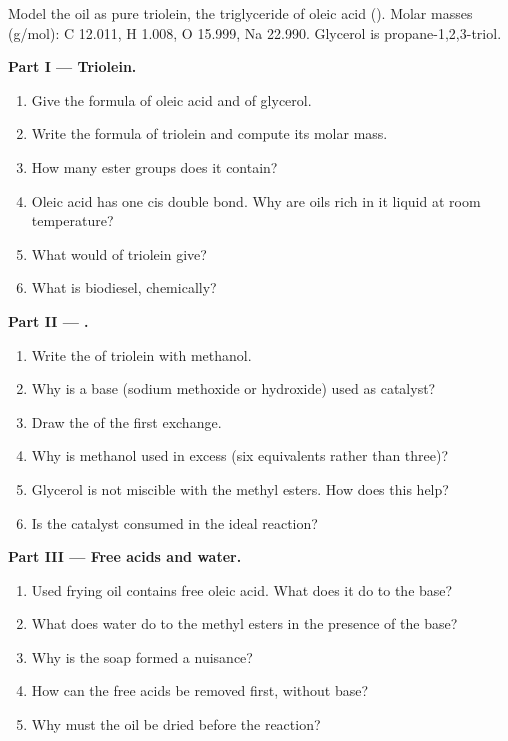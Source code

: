 \begin{problem}
\label{pb:b2:acyl-substitution:1}
Model the oil as pure triolein, the triglyceride of oleic acid (). Molar masses
(\unit{g/mol}): C 12.011, H 1.008, O 15.999, Na 22.990. Glycerol is propane-1,2,3-triol.

\medskip
\noindent\textbf{Part I --- Triolein.}
\begin{enumerate}
  \item Give the formula of oleic acid and of glycerol.
  \item Write the formula of triolein and compute its molar mass.
  \item How many ester groups does it contain?
  \item Oleic acid has one cis double bond. Why are oils rich in it liquid at room temperature?
  \item What would  of triolein give?
  \item What is biodiesel, chemically?
\end{enumerate}

\medskip
\noindent\textbf{Part II --- .}
\begin{enumerate}[resume]
  \item Write the  of triolein with methanol.
  \item Why is a base (sodium methoxide or hydroxide) used as catalyst?
  \item Draw the  of the first exchange.
  \item Why is methanol used in excess (six equivalents rather than three)?
  \item Glycerol is not miscible with the methyl esters. How does this help?
  \item Is the catalyst consumed in the ideal reaction?
\end{enumerate}

\medskip
\noindent\textbf{Part III --- Free acids and water.}
\begin{enumerate}[resume]
  \item Used frying oil contains free oleic acid. What does it do to the base?
  \item What does water do to the methyl esters in the presence of the base?
  \item Why is the soap formed a nuisance?
  \item How can the free acids be removed first, without base?
  \item Why must the oil be dried before the reaction?
\end{enumerate}


\end{problem}
